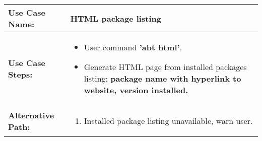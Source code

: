 \medskip

\begin{tabularx}{\linewidth}{|l|X|}
\hline
\textbf{Use Case Name:} & \textbf{HTML package listing} \\
\hline
\textbf{Use Case Steps:} & 
\begin{minipage}{\linewidth} 
  \vspace{0.05em}
  \begin{itemize}
    \item User command \textbf{'abt html'}.
    \item Generate HTML page from installed packages listing; \textbf{package name with hyperlink to website, version installed.}
  \end{itemize}
  \vspace{0.05em}
\end{minipage}
\\
\hline 
\textbf{Alternative Path:} &
\begin{minipage}{\linewidth}
  \vspace{0.05em} 
  \begin{enumerate}
    \item Installed package listing unavailable, warn user.
  \end{enumerate}
  \vspace{0.05em} 
\end{minipage}
\\
\hline
\end{tabularx}